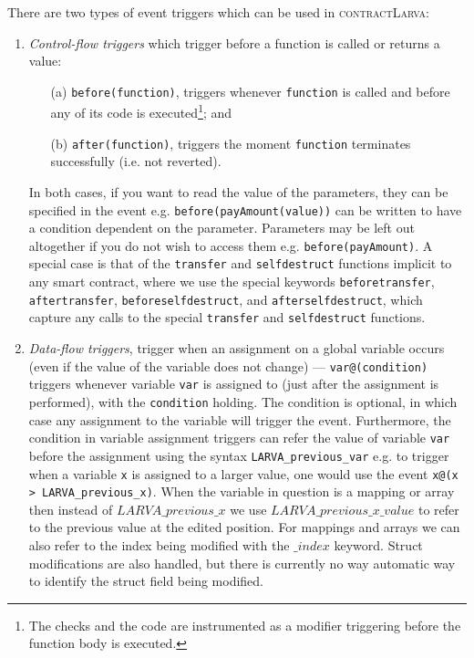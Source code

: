 \documentclass{article}
\newcommand{\contractlarva}{\textsc{contractLarva}\xspace}
\begin{document}
  \noindent There are two types of event triggers which can be used in \contractlarva:
  \begin{enumerate}[label=(\roman*)]
    \item \emph{Control-flow triggers} which trigger before a function is called or returns a value: 
    
    \begin{enumerate}
    	\item[(a)] \texttt{before(function)}, triggers whenever \texttt{function} is called and before any of its code is executed\footnote{The checks and the code are instrumented as a modifier triggering before the function body is executed.}; and 
    
    \item[(b)] \texttt{after(function)}, triggers the moment \texttt{function} terminates successfully (i.e. not reverted).
    
    \end{enumerate}
    
    In both cases, if you want to read the value of the parameters, they can be specified in the event e.g. \texttt{before(payAmount(value))} can be written to have a condition dependent on the parameter. Parameters may be left out altogether if you do not wish to access them e.g.  \texttt{before(payAmount)}. A special case is that of the \texttt{transfer} and \texttt{selfdestruct} functions implicit to any smart contract, where we use the special keywords \texttt{beforetransfer}, \texttt{aftertransfer}, \texttt{beforeselfdestruct}, and \texttt{afterselfdestruct}, which capture any calls to the special \texttt{transfer} and \texttt{selfdestruct} functions.
    \item \emph{Data-flow triggers}, trigger when an assignment on a global variable occurs (even if the value of the variable does not change) --- \texttt{var@(condition)}  triggers whenever variable \texttt{var} is assigned to (just after the assignment is performed), with the \texttt{condition} holding. The condition is optional, in which case any assignment to the variable will trigger the event. Furthermore, the condition in variable assignment triggers can refer the value of variable \texttt{var} before the assignment using the syntax \texttt{LARVA\_previous\_var} e.g. to trigger when a variable \texttt{x} is assigned to a larger value, one would use the event \texttt{x@(x > LARVA\_previous\_x)}. When the variable in question is a mapping or array then instead of $LARVA\_previous\_x$ we use $LARVA\_previous\_x\_value$ to refer to the previous value at the edited position. For mappings and arrays we can also refer to the index being modified with the $\_index$ keyword. Struct modifications are also handled, but there is currently no way automatic way to identify the struct field being modified.
  \end{enumerate}
      
\end{document}
